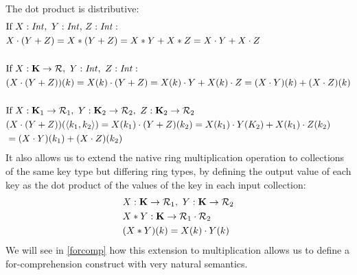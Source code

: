 {{{The dot product is distributive:
\vs\begin{equation*}
\begin{split}
& \textrm{If } X: \textrm{\textit{Int}}, \ Y: \textrm{\textit{Int}}\textrm, \ Z: \textrm{\textit{Int}}: \\
&X \cdot (Y + Z) = X * (Y + Z) = X*Y + X*Z = X \cdot Y + X \cdot Z \\ \\
& \textrm{If } X: \mathbf{K} \rightarrow \mathcal{R}, \ Y: \textrm{\textit{Int}}, \ Z: \textrm{\textit{Int}}: \\
& (X \cdot (Y+Z))(k) = X(k) \cdot (Y+Z) = X(k) \cdot Y + X(k) \cdot Z = (X \cdot Y)(k) + (X \cdot Z)(k) \\ \\
& \textrm{If } X: \mathbf{K}_1 \rightarrow \mathcal{R}_1, \ Y: \mathbf{K}_2 \rightarrow \mathcal{R}_2, \ Z: \mathbf{K}_2 \rightarrow \mathcal{R}_2 \\
& (X \cdot (Y+Z))(\langle k_1, k_2 \rangle) = X(k_1) \cdot (Y+Z)(k_2) = X(k_1) \cdot Y(K_2) + X(k_1) \cdot Z(k_2) \\
&= (X \cdot Y)(k_1) + (X \cdot Z)(k_2) 
\end{split}
\end{equation*}
It also allows us to extend the native ring multiplication operation to collections of the same key type but differing ring types, by defining the output value of each key as the dot product of the values of the key in each input collection:
\begin{equation*}
\begin{split}
& X: \mathbf{K} \rightarrow \mathcal{R}_1, \ Y: \mathbf{K} \rightarrow \mathcal{R}_2 \\
& X * Y : \mathbf{K} \rightarrow \mathcal{R}_1 \cdot \mathcal{R}_2 \\
& (X*Y)(k) = X(k) \cdot Y(k)
\end{split}
\end{equation*}
We will see in \ref{forcomp} how this extension to multiplication allows us to define a for-comprehension construct with very natural semantics.

}}}
